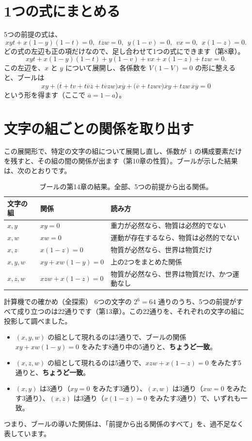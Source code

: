 \documentclass[a4paper,11pt,openany]{ltjsbook}
\newcommand{\nx}[1]{\overline{#1}}
\begin{document}
\section{1つの式にまとめる}

5つの前提の式は、
\[
xyt+x(1-y)(1-t)=0,\ \ tzw=0,\ \ y(1-v)=0,\ \ vx=0,\ \ x(1-z)=0 .
\]
どの式の左辺も正の項だけなので、足し合わせて1つの式にできます（第8章）。
\[
xyt+x(1-y)(1-t)+y(1-v)+vx+x(1-z)+tzw=0 .
\]
この左辺を、$x$ と $y$ について展開し、各係数を $V(1-V)=0$ の形に整えると、ブールは
\[
xy+\bigl(\nx t+tv+t\nx v\nx z+t\nx v zw\bigr)x\nx y+\bigl(\nx v+tzwv\bigr)\nx x y+tzw\,\nx x\nx y=0
\]
という形を得ます（ここで $\nx{a}=1-a$）。

\section{文字の組ごとの関係を取り出す}

この展開形で、特定の文字の組について展開し直し、係数が $1$ の構成要素だけを残すと、その組の間の関係が出ます（第10章の性質）。ブールが示した結果は、次のとおりです。

\begin{table}[htbp]
\centering
\begin{tabular}{lll}
\toprule
文字の組 & 関係 & 読み方\\
\midrule
$x,y$ & $xy=0$ & 重力が必然なら、物質は必然的でない\\
$x,w$ & $xw=0$ & 運動が存在するなら、物質は必然的でない\\
$x,z$ & $x(1-z)=0$ & 物質が必然なら、世界は物質だけ\\
$x,y,w$ & $xy+xw(1-y)=0$ & 上の2つをまとめた関係\\
$x,z,w$ & $xzw+x(1-z)=0$ & 物質が必然なら、世界は物質だけ、かつ運動なし\\
\bottomrule
\end{tabular}
\caption{ブールの第14章の結果。全部、5つの前提から出る関係。}
\end{table}

\begin{examplebox}{計算機での確かめ（全探索）}
6つの文字の $2^6=64$ 通りのうち、5つの前提がすべて成り立つのは22通りです（第13章）。この22通りを、それぞれの文字の組に投影して調べました。
\begin{itemize}[leftmargin=*]
\item $(x,y,w)$ の組として現れるのは5通りで、ブールの関係 $xy+xw(1-y)=0$ をみたす8通り中の5通りと、\textbf{ちょうど一致}。
\item $(x,z,w)$ の組として現れるのは5通りで、$xzw+x(1-z)=0$ をみたす5通りと、\textbf{ちょうど一致}。
\item $(x,y)$ は3通り（$xy=0$ をみたす3通り）、$(x,w)$ は3通り（$xw=0$ をみたす3通り）、$(x,z)$ は3通り（$x(1-z)=0$ をみたす3通り）で、いずれも一致。
\end{itemize}
つまり、ブールの導いた関係は、「前提から出る関係のすべて」を、過不足なく表しています。
\end{examplebox}
\end{document}
